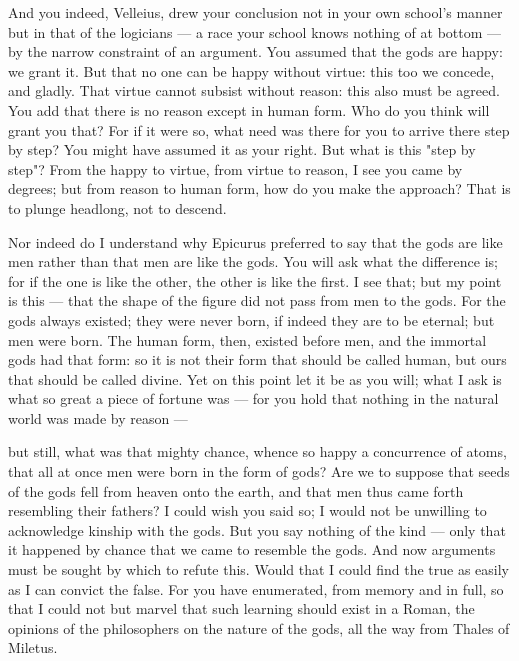  And you indeed, Velleius, drew your conclusion not in your own school's manner but in that of the logicians — a race your school knows nothing of at bottom — by the narrow constraint of an argument. You assumed that the gods are happy: we grant it. But that no one can be happy without virtue: this too we concede, and gladly. That virtue cannot subsist without reason: this also must be agreed. You add that there is no reason except in human form. Who do you think will grant you that? For if it were so, what need was there for you to arrive there step by step? You might have assumed it as your right. But what is this "step by step"? From the happy to virtue, from virtue to reason, I see you came by degrees; but from reason to human form, how do you make the approach? That is to plunge headlong, not to descend.

 Nor indeed do I understand why Epicurus preferred to say that the gods are like men rather than that men are like the gods. You will ask what the difference is; for if the one is like the other, the other is like the first. I see that; but my point is this — that the shape of the figure did not pass from men to the gods. For the gods always existed; they were never born, if indeed they are to be eternal; but men were born. The human form, then, existed before men, and the immortal gods had that form: so it is not their form that should be called human, but ours that should be called divine. Yet on this point let it be as you will; what I ask is what so great a piece of fortune was — for you hold that nothing in the natural world was made by reason —

 but still, what was that mighty chance, whence so happy a concurrence of atoms, that all at once men were born in the form of gods? Are we to suppose that seeds of the gods fell from heaven onto the earth, and that men thus came forth resembling their fathers? I could wish you said so; I would not be unwilling to acknowledge kinship with the gods. But you say nothing of the kind — only that it happened by chance that we came to resemble the gods. And now arguments must be sought by which to refute this. Would that I could find the true as easily as I can convict the false. For you have enumerated, from memory and in full, so that I could not but marvel that such learning should exist in a Roman, the opinions of the philosophers on the nature of the gods, all the way from Thales of Miletus.

